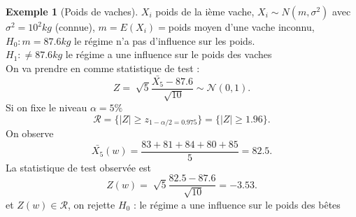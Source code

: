 \documentclass{article}
\theoremstyle{plain}%
\theoremstyle{definition}
\newtheorem{exmp}{Exemple}[section]
\theoremstyle{remark}
\begin{document}
\begin{exmp}[Poids de vaches]
    $ X_i $ poids de la ième vache, $ X_i \sim N(m, \sigma ^2) $ avec $ \sigma ^2 = 10^2 kg $ (connue), $ m=E(X_i)=$poids moyen d'une vache inconnu, \\
    $ H_0: m=87.6kg$ le régime n'a pas d'influence sur les poids. \\
    $ H_1: \neq 87.6kg $ le régime a une influence sur le poids des vaches \\
    On va prendre en comme statistique de test :
    \[
        Z= \sqrt[]{5} \frac{\bar{X_5} - 87.6}{\sqrt[]{10}} \sim \mathcal{N}(0,1)
    .\]
    Si on fixe le niveau $ \alpha = 5\% $ 
    \[
        \mathcal{R} = \{\left| Z \right| \geq z_{1-\alpha/2 = 0.975}\} = \{\left| Z \right| \geq 1.96\}
    .\]
    On observe 
    \[
        \bar{X_5}(w) = \frac{83+81+84+80+85}{5} = 82.5
    .\]
    La statistique de test observée est 
    \[
        Z(w) = \sqrt[]{5} \frac{82.5 - 87.6}{\sqrt[]{10}} = -3.53
    .\]
    et $ Z(w) \in \mathcal{R} $, on rejette $ H_0 $ : le régime a une influence sur le poids des bêtes


\end{exmp}
\end{document}
